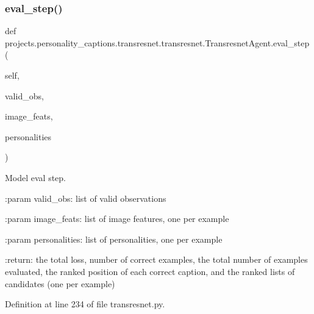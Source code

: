\mbox{\label{classprojects_1_1personality__captions_1_1transresnet_1_1transresnet_1_1TransresnetAgent_a407247b202808f7cc820819e6192c448}} 
\subsubsection{\texorpdfstring{eval\+\_\+step()}{eval\_step()}}
{\footnotesize\ttfamily def projects.\+personality\+\_\+captions.\+transresnet.\+transresnet.\+Transresnet\+Agent.\+eval\+\_\+step (\begin{DoxyParamCaption}\item[{}]{self,  }\item[{}]{valid\+\_\+obs,  }\item[{}]{image\+\_\+feats,  }\item[{}]{personalities }\end{DoxyParamCaption})}

\begin{DoxyVerb}Model eval step.

:param valid_obs:
    list of valid observations

:param image_feats:
    list of image features, one per example

:param personalities:
    list of personalities, one per example

:return:
    the total loss, number of correct examples, the total number of
    examples evaluated, the ranked position of each correct caption,
    and the ranked lists of candidates (one per example)
\end{DoxyVerb}
 

Definition at line 234 of file transresnet.\+py.


